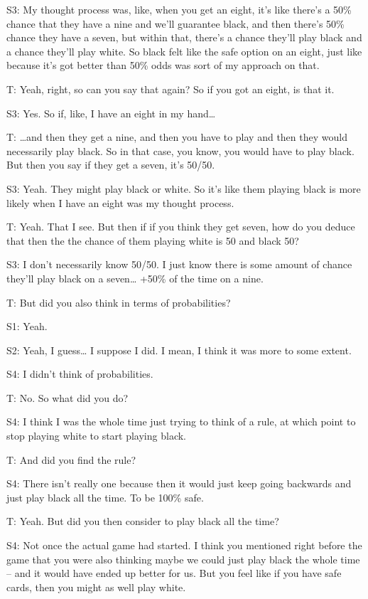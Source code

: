 S3: My thought process was, like, when you get an eight, it's like there's a 50\% chance that they have a nine and we'll guarantee black, and then there's 50\% chance they have a seven, but within that, there's a chance they'll play black and a chance they'll play white. So black felt like the safe option on an eight, just like because it's got better than 50\% odds was sort of my approach on that. 

T: Yeah, right, so can you say that again? So if you got an eight, is that it. 

S3: Yes. So if, like, I have an eight in my hand…

T: …and then they get a nine, and then you have to play and then they would necessarily play black. So in that case, you know, you would have to play black. But then you say if they get a seven, it's 50/50.

S3: Yeah. They might play black or white. So it's like them playing black is more likely when I have an eight was my thought process.

T: Yeah. That I see. But then if if you think they get seven, how do you deduce that then the the chance of them playing white is 50 and black 50? 

S3: I don't necessarily know 50/50. I just know there is some amount of chance they'll play black on a seven… +50\% of the time on a nine.

T: But did you also think in terms of probabilities? 

S1: Yeah.

S2: Yeah, I guess… I suppose I did. I mean, I think it was more to some extent. 

S4: I didn't think of probabilities. 

T: No. So what did you do? 

S4: I think I was the whole time just trying to think of a rule, at which point to stop playing white to start playing black.

T: And did you find the rule? 

S4: There isn't really one because then it would just keep going backwards and just play black all the time. To be 100\% safe. 

T: Yeah. But did you then consider to play black all the time? 

S4: Not once the actual game had started. I think you mentioned right before the game that you were also thinking maybe we could just play black the whole time – and it would have ended up better for us. But you feel like if you have safe cards, then you might as well play white. 

